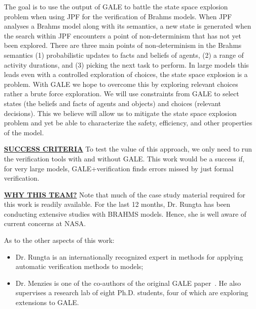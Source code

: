\documentclass[12pt]{article}
\newcommand{\bi}{\begin{itemize}[leftmargin=0.4cm]}
\newcommand{\ei}{\end{itemize}}
\begin{document}
The goal is to use the output of GALE to battle the state space explosion problem when using JPF for the verification of Brahms models. When JPF analyses a Brahms model along with its semantics, a new state is generated when the search within JPF encounters a point of non-determinism that has not yet been explored.  There are three main points of
non-determinism in the Brahms semantics  (1) probabilistic updates to facts and beliefs of agents, (2) a range of activity durations, and (3) picking the next task to perform. In large models this leads even with a controlled exploration of choices, the state space explosion is a problem. With GALE we hope to overcome this by exploring relevant choices rather a brute force exploration. We will use constraints from GALE to select states (the beliefs and facts of agents and objects) and choices (relevant decisions). This we believe will allow us to mitigate the state space explosion problem and yet be able to characterize the safety, efficiency, and other properties of the model. 


\noindent
\underline{{\bf SUCCESS CRITERIA}}  To test
the value of this approach, we only
need to run the verification tools with and without
GALE. This work would be a success if, for very large models,
GALE+verification finds errors missed by just formal verification.

\noindent
\underline{{\bf WHY THIS TEAM?}} 
Note that much of the case study material required for this
work is readily available. For the last
12 months, Dr. Rungta has been conducting extensive studies
with BRAHMS models. Hence, she is well aware of current
concerns at NASA.

As to the other aspects of this
work:
\bi
\item
Dr. Rungta is an internationally recognized expert in
methods for applying automatic verification methods to models;
\item
Dr. Menzies is one of the co-authors of the original GALE 
paper~\cite{krall2015gale}. He also supervises
a research lab of eight Ph.D. students, four of
which are exploring extensions to GALE.
\ei

\newpage


\end{document}

